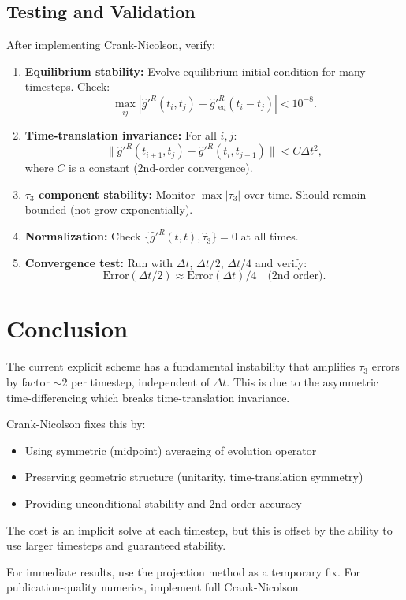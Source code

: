 \documentclass[11pt]{article}
\begin{document}
\subsection{Testing and Validation}

After implementing Crank-Nicolson, verify:

\begin{enumerate}
\item \textbf{Equilibrium stability:} Evolve equilibrium initial condition for many timesteps. Check:
\begin{equation}
\max_{ij} |\hat{g}'^R(t_i, t_j) - \hat{g}'^R_{\text{eq}}(t_i - t_j)| < 10^{-8}.
\end{equation}

\item \textbf{Time-translation invariance:} For all $i, j$:
\begin{equation}
\|\hat{g}'^R(t_{i+1}, t_j) - \hat{g}'^R(t_i, t_{j-1})\| < C \Delta t^2,
\end{equation}
where $C$ is a constant (2nd-order convergence).

\item \textbf{$\tau_3$ component stability:} Monitor $\max|\tau_3|$ over time. Should remain bounded (not grow exponentially).

\item \textbf{Normalization:} Check $\{\hat{g}'^R(t,t), \hat{\tau}_3\} = 0$ at all times.

\item \textbf{Convergence test:} Run with $\Delta t$, $\Delta t/2$, $\Delta t/4$ and verify:
\begin{equation}
\text{Error}(\Delta t/2) \approx \text{Error}(\Delta t) / 4 \quad \text{(2nd order)}.
\end{equation}
\end{enumerate}

\section{Conclusion}

The current explicit scheme has a fundamental instability that amplifies $\tau_3$ errors by factor $\sim 2$ per timestep, independent of $\Delta t$. This is due to the asymmetric time-differencing which breaks time-translation invariance.

Crank-Nicolson fixes this by:
\begin{itemize}
\item Using symmetric (midpoint) averaging of evolution operator
\item Preserving geometric structure (unitarity, time-translation symmetry)
\item Providing unconditional stability and 2nd-order accuracy
\end{itemize}

The cost is an implicit solve at each timestep, but this is offset by the ability to use larger timesteps and guaranteed stability.

For immediate results, use the projection method as a temporary fix. For publication-quality numerics, implement full Crank-Nicolson.
\end{document}
